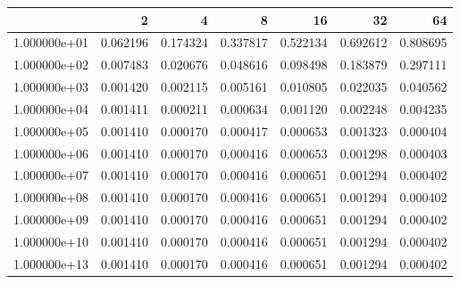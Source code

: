 \begin{tabular}{lrrrrrr}
\toprule
{} &        2  &        4  &        8  &        16 &        32 &        64 \\
\midrule
1.000000e+01 &  0.062196 &  0.174324 &  0.337817 &  0.522134 &  0.692612 &  0.808695 \\
1.000000e+02 &  0.007483 &  0.020676 &  0.048616 &  0.098498 &  0.183879 &  0.297111 \\
1.000000e+03 &  0.001420 &  0.002115 &  0.005161 &  0.010805 &  0.022035 &  0.040562 \\
1.000000e+04 &  0.001411 &  0.000211 &  0.000634 &  0.001120 &  0.002248 &  0.004235 \\
1.000000e+05 &  0.001410 &  0.000170 &  0.000417 &  0.000653 &  0.001323 &  0.000404 \\
1.000000e+06 &  0.001410 &  0.000170 &  0.000416 &  0.000653 &  0.001298 &  0.000403 \\
1.000000e+07 &  0.001410 &  0.000170 &  0.000416 &  0.000651 &  0.001294 &  0.000402 \\
1.000000e+08 &  0.001410 &  0.000170 &  0.000416 &  0.000651 &  0.001294 &  0.000402 \\
1.000000e+09 &  0.001410 &  0.000170 &  0.000416 &  0.000651 &  0.001294 &  0.000402 \\
1.000000e+10 &  0.001410 &  0.000170 &  0.000416 &  0.000651 &  0.001294 &  0.000402 \\
1.000000e+13 &  0.001410 &  0.000170 &  0.000416 &  0.000651 &  0.001294 &  0.000402 \\
\bottomrule
\end{tabular}
